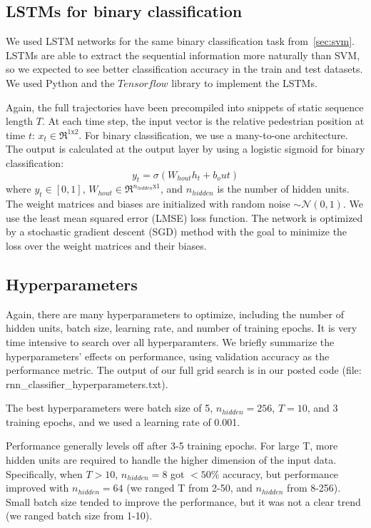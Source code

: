 \subsection{LSTMs for binary classification}
We used LSTM networks for the same binary classification task from~\cref{sec:svm}.
LSTMs are able to extract the sequential information more naturally than SVM, so we expected to see better classification accuracy in the train and test datasets.
We used Python and the $\textit{Tensorflow}$ library to implement the LSTMs.

Again, the full trajectories have been precompiled into snippets of static sequence length $T$.
At each time step, the input vector is the relative pedestrian position at time $t$: $x_t \in \Re^{1\text{x}2}$.
For binary classification, we use a many-to-one architecture.
The output is calculated at the output layer by using a logistic sigmoid for binary classification:
\begin{equation}
y_t = \sigma(W_{hout}h_t + b_out)
\label{eq:bin_class_out} 
\end{equation}
where $y_t \in [0,1]$, $W_{hout} \in \Re^{n_{hidden} \text{x} 1}$, and $n_{hidden}$ is the number of hidden units.
The weight matrices and biases are initialized with random noise $\sim\mathcal{N}(0,1)$.
We use the least mean squared error (LMSE) loss function.
The network is optimized by a stochastic gradient descent (SGD) method with the goal to minimize the loss over the weight matrices and their biases.

\subsection{Hyperparameters}
Again, there are many hyperparameters to optimize, including the number of hidden units, batch size, learning rate, and number of training epochs.
It is very time intensive to search over all hyperparamters.
We briefly summarize the hyperparameters' effects on performance, using validation accuracy as the performance metric.
The output of our full grid search is in our posted code (file: rnn\_classifier\_hyperparameters.txt).

The best hyperparameters were batch size of 5, $n_{hidden}=256$, $T=10$, and 3 training epochs, and we used a learning rate of 0.001.

Performance generally levels off after 3-5 training epochs.
For large T, more hidden units are required to handle the higher dimension of the input data.
Specifically, when $T>10$, $n_{hidden}=8$ got $<50\%$ accuracy, but performance improved with $n_{hidden}=64$ (we ranged T from 2-50, and $n_{hidden}$ from 8-256).
Small batch size tended to improve the performance, but it was not a clear trend (we ranged batch size from 1-10).

